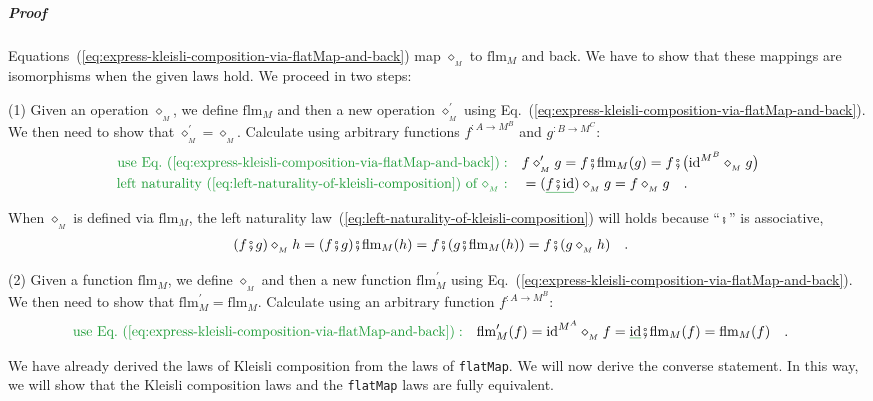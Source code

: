\subparagraph{Proof}

Equations~(\ref{eq:express-kleisli-composition-via-flatMap-and-back})
map $\diamond_{_{M}}$ to $\text{flm}_{M}$ and back. We have to show
that these mappings are isomorphisms when the given laws hold. We
proceed in two steps:

(1) Given an operation $\diamond_{_{M}}$, we define $\text{flm}_{M}$
and then a new operation $\diamond_{_{M}}^{\prime}$ using Eq.~(\ref{eq:express-kleisli-composition-via-flatMap-and-back}).
We then need to show that $\diamond_{_{M}}^{\prime}=\diamond_{_{M}}$.
Calculate using arbitrary functions $f^{:A\rightarrow M^{B}}$ and
$g^{:B\rightarrow M^{C}}$:
\begin{align*}
{\color{greenunder}\text{use Eq.~(\ref{eq:express-kleisli-composition-via-flatMap-and-back})}:}\quad & f\diamond_{_{M}}^{\prime}g=f\bef\text{flm}_{M}(g)=f\bef\big(\text{id}^{M^{B}}\diamond_{_{M}}g\big)\\
{\color{greenunder}\text{left naturality~(\ref{eq:left-naturality-of-kleisli-composition}) of }\diamond_{_{M}}:}\quad & =(\gunderline{f\bef\text{id}})\diamond_{_{M}}g=f\diamond_{_{M}}g\quad.
\end{align*}

When $\diamond_{_{M}}$ is defined via $\text{flm}_{M}$, the left
naturality law~(\ref{eq:left-naturality-of-kleisli-composition})
will holds because \textsf{``}$\bef$\textsf{''} is associative,
\begin{align*}
 & (f\bef g)\diamond_{_{M}}h=(f\bef g)\bef\text{flm}_{M}(h)=f\bef(g\bef\text{flm}_{M}(h))=f\bef(g\diamond_{_{M}}h)\quad.
\end{align*}

(2) Given a function $\text{flm}_{M}$, we define $\diamond_{_{M}}$
and then a new function $\text{flm}_{M}^{\prime}$ using Eq.~(\ref{eq:express-kleisli-composition-via-flatMap-and-back}).
We then need to show that $\text{flm}_{M}^{\prime}=\text{flm}_{M}$.
Calculate using an arbitrary function $f^{:A\rightarrow M^{B}}$:
\begin{align*}
{\color{greenunder}\text{use Eq.~(\ref{eq:express-kleisli-composition-via-flatMap-and-back})}:}\quad & \text{flm}_{M}^{\prime}(f)=\text{id}^{M^{A}}\diamond_{_{M}}f=\gunderline{\text{id}}\bef\text{flm}_{M}(f)=\text{flm}_{M}(f)\quad.
\end{align*}

We have already derived the laws of Kleisli composition from the laws
of \lstinline!flatMap!. We will now derive the converse statement.
In this way, we will show that the Kleisli composition laws and the
\lstinline!flatMap! laws are fully equivalent.

